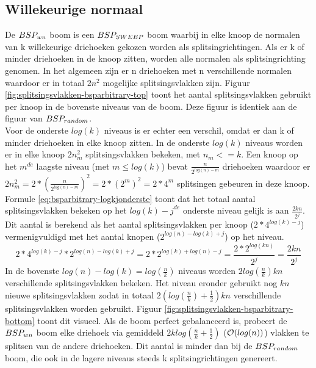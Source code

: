 \subsection{Willekeurige normaal}
    De $BSP_{wn}$ boom is een $BSP_{SWEEP}$ boom waarbij in elke knoop de normalen van k willekeurige driehoeken gekozen worden als splitsingrichtingen.
    Als er k of minder driehoeken in de knoop zitten, worden alle normalen als splitsingrichting genomen.
    In het algemeen zijn er n driehoeken met n verschillende normalen waardoor er in totaal $2n^2$ mogelijke splitsingsvlakken zijn.
    Figuur \ref{fig:splitsingsvlakken-bsparbitrary-top} toont het aantal splitsingsvlakken gebruikt per knoop in de bovenste niveaus van de boom.
    Deze figuur is identiek aan de figuur van $BSP_{random}$. \\

    Voor de onderste $log(k)$ niveaus is er echter een verschil, omdat er dan k of minder driehoeken in elke knoop zitten.
    In de onderste $log(k)$ niveaus worden er in elke knoop $2n_m^2$ splitsingsvlakken bekeken, met $n_m <= k$.
    Een knoop op het $m^{de}$ laagste niveau (met $m \leq log(k)$) bevat $\frac{n}{2^{log(n) - m}}$ driehoeken waardoor er $2n_m^2 = 2 * (\frac{n}{2^{log(n) - m}})^2 = 2*(2^m)^2 = 2*4^m$ splitsingen gebeuren in deze knoop.
    Formule \ref{eq:bsparbitrary-logkjonderste} toont dat het totaal aantal splitsingsvlakken bekeken op het ${log(k) - j}^{de}$ onderste niveau gelijk is aan $\frac{2kn}{2^j}$. Dit aantal is berekend als het aantal splitsingsvlakken per knoop ($2*4^{log(k) - j}$) vermenigvuldigd met het aantal knopen ($2^{log(n)-log(k)+j}$) op het niveau.
    \begin{equation}
        \label{eq:bsparbitrary-logkjonderste}
    2*4^{log(k) - j} * 2^{log(n)-log(k)+j} = 2 * 2^{log(k) + log(n) - j} = \frac{2 * 2^{log(kn)}}{2^j} =\frac{2kn}{2^j}
    \end{equation}
    In de bovenste $log(n) - log(k) = log(\frac{n}{k})$ niveaus worden $2log(\frac{n}{k})kn$ verschillende splitsingsvlakken bekeken.
    Het niveau eronder gebruikt nog $kn$ nieuwe splitsingsvlakken zodat in totaal $2(log(\frac{n}{k}) + \frac{1}{2})kn$ verschillende splitsingsvlakken worden gebruikt.
    Figuur \ref{fig:splitsingsvlakken-bsparbitrary-bottom} toont dit visueel.
    Als de boom perfect gebalanceerd is, probeert de $BSP_{wn}$ boom elke driehoek via gemiddeld $2klog(\frac{n}{k} + \frac{1}{2})$ ($\mathcal{O}(log(n))$) vlakken te splitsen van de andere driehoeken. Dit aantal is minder dan bij de $BSP_{random}$ boom, die ook in de lagere niveaus steeds k splitsingrichtingen genereert.\\

